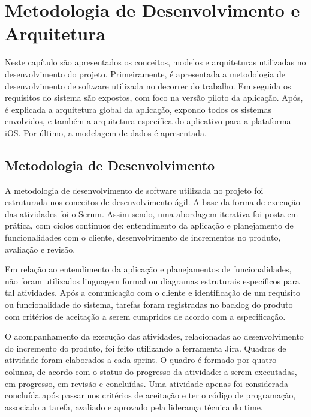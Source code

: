 \chapter{Metodologia de Desenvolvimento e Arquitetura} \label{cap:architecture}
Neste capítulo são apresentados os conceitos, modelos e arquiteturas utilizadas no desenvolvimento do projeto. Primeiramente, é apresentada a metodologia de desenvolvimento de software utilizada no decorrer do trabalho. Em seguida os requisitos do sistema são expostos, com foco na versão piloto da aplicação. Após, é explicada a arquitetura global da aplicação, expondo todos os sistemas envolvidos, e também a arquitetura específica do aplicativo para a plataforma iOS. Por último, a modelagem de dados é apresentada.

\section{Metodologia de Desenvolvimento}
A metodologia de desenvolvimento de software utilizada no projeto foi estruturada nos conceitos de desenvolvimento ágil. A base da forma de execução das atividades foi o Scrum. Assim sendo, uma abordagem iterativa foi posta em prática, com ciclos contínuos de: entendimento da aplicação e planejamento de funcionalidades com o cliente, desenvolvimento de incrementos no produto, avaliação e revisão.

Em relação ao entendimento da aplicação e planejamentos de funcionalidades, não foram utilizados linguagem formal ou diagramas estruturais específicos para tal atividades. Após a comunicação com o cliente e identificação de um requisito ou funcionalidade do sistema, tarefas foram registradas no backlog do produto com critérios de aceitação a serem cumpridos de acordo com a especificação.

O acompanhamento da execução das atividades, relacionadas ao desenvolvimento do incremento do produto, foi feito utilizando a ferramenta Jira. Quadros de atividade  foram elaborados a cada sprint. O quadro é formado por quatro colunas, de acordo com o status do progresso da atividade: a serem executadas, em progresso, em revisão e concluídas. Uma atividade apenas foi considerada concluída após passar nos critérios de aceitação e ter o código de programação, associado a tarefa, avaliado e aprovado pela liderança técnica do time.



